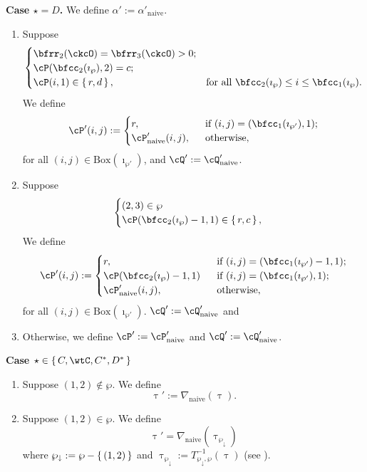 \documentclass[12pt,a4paper]{amsart}
\def\tnaive{\mathrm{naive}}
\def\wpm{\wp_{\downarrow}}
\def\alphapn{\alpha'_{\tnaive}}
\def\DDn{\nabla_{\tnaive}}
\numberwithin{equation}{section}
\theoremstyle{remark}
\newcommand{\BOX}[1]{\mathrm{Box}(#1)}
\def\AND{\quad \text{and} \quad}
\def\imathwpp{\imath_{\wp'}}
\def\cPpn{\cP'_\mathrm{naive}}
\def\cQpn{\cQ'_\mathrm{naive}}
\begin{document}
{\bfseries Case $\star = D$. }
We define $\alpha' := \alphapn$.
\begin{enumerate}[label=(\alph*)]
  \item  Suppose
  \[
    \begin{cases}
      \bfrr_2(\ckcO)=\bfrr_{3}(\ckcO)>0; & \\
      \cP(\bfcc_{2}(\imath_{\wp}),2) = c;  &\\
      \cP(i,1)\in \set{r,d}, & \text{for all
        $\bfcc_{2}(\imath_{\wp})\leq i\leq \bfcc_{1}(\imath_{\wp})$}.
    \end{cases}
  \]
  We define %
  \[
    \cP'(i,j) := \begin{cases}
      r, & \ \text{ if $(i,j) = (\bfcc_1(\imathwpp),1)$;}\\
      \cPpn(i,j), & \ \text{ otherwise},
    \end{cases}
  \] for all $(i,j)\in \BOX{\imathwpp}$, and
  $\cQ' := \cQpn $.
  \item Suppose
  \[
    \begin{cases}
      (2,3)\in \wp & \\
      \cP(\bfcc_2(\imath_{\wp})-1,1)\in \set{r,c},
    \end{cases}
  \]
  We define
  \[
    \cP'(i,j) := \begin{cases}
      r, & \ \text{ if $(i,j) = (\bfcc_1(\imathwpp)-1,1)$;}\\
      \cP(\bfcc_2(\imath_{\wp})-1,1) & \ \text{ if $(i,j) = (\bfcc_1(\imathwpp),1)$;}\\
      \cPpn(i,j), & \ \text{ otherwise},
    \end{cases}
  \] for all $(i,j)\in \BOX{\imathwpp}$.
  $\cQ' := \cQpn $ and
  \item Otherwise, we define $\cP' := \cPpn$ and $\cQ':= \cQpn$.
\end{enumerate}

{\bfseries Case $\star \in \set{C,\wtC,C^{*},D^{*}}$}

\begin{enumerate}[label=(\alph*)]
  \item Suppose $(1,2)\notin \wp$. We define
  \[
    \uptau' := \DDn(\uptau).
  \]
  \item Suppose $(1,2)\in \wp$. We define
  \[
  \uptau' = \DDn(\uptau_{\wpm})
  \]
  where $\wpm := \wp - \set{(1,2)}$ and
  $\uptau_{\wpm}  := T_{\wpm,\wp}^{-1}(\uptau)$ (see ).
\end{enumerate}
\end{document}
